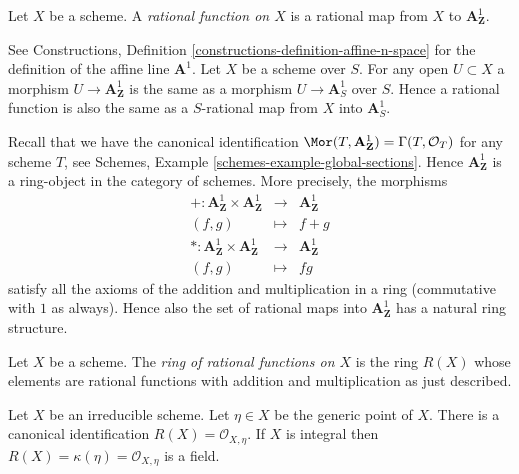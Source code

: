 \begin{definition}
\label{definition-rational-function}
Let $X$ be a scheme. A {\it rational function on $X$} is a rational map
from $X$ to $\mathbf{A}^1_{\mathbf{Z}}$.
\end{definition}

\noindent
See Constructions, Definition \ref{constructions-definition-affine-n-space}
for the definition of the affine line $\mathbf{A}^1$. Let $X$ be a scheme
over $S$. For any open $U \subset X$ a morphism
$U \to \mathbf{A}^1_{\mathbf{Z}}$ is the same as a morphism
$U \to \mathbf{A}^1_S$ over $S$. Hence a rational function is
also the same as a $S$-rational map from $X$ into $\mathbf{A}^1_S$.

\medskip\noindent
Recall that we have the canonical identification
$\Mor(T, \mathbf{A}^1_{\mathbf{Z}}) = \Gamma(T, \mathcal{O}_T)$
for any scheme $T$, see Schemes, Example \ref{schemes-example-global-sections}.
Hence $\mathbf{A}^1_{\mathbf{Z}}$ is a ring-object in the
category of schemes. More precisely, the morphisms
\begin{eqnarray*}
+ : \mathbf{A}^1_{\mathbf{Z}} \times \mathbf{A}^1_{\mathbf{Z}}
& \longrightarrow &
\mathbf{A}^1_{\mathbf{Z}} \\
(f, g) & \longmapsto & f + g \\
* : \mathbf{A}^1_{\mathbf{Z}} \times \mathbf{A}^1_{\mathbf{Z}}
& \longrightarrow &
\mathbf{A}^1_{\mathbf{Z}} \\
(f, g) & \longmapsto & fg
\end{eqnarray*}
satisfy all the axioms of the addition and multiplication in a ring
(commutative with $1$ as always). Hence also the set of rational
maps into $\mathbf{A}^1_{\mathbf{Z}}$ has a natural ring structure.

\begin{definition}
\label{definition-ring-of-rational-functions}
Let $X$ be a scheme. The {\it ring of rational functions on $X$}
is the ring $R(X)$ whose elements are rational functions with
addition and multiplication as just described.
\end{definition}

\begin{lemma}
\label{lemma-integral-scheme-rational-functions}
Let $X$ be an irreducible scheme. Let $\eta \in X$ be the generic point
of $X$. There is a canonical identification
$R(X) = \mathcal{O}_{X, \eta}$. If $X$ is integral then
$R(X) = \kappa(\eta) = \mathcal{O}_{X, \eta}$ is
a field.
\end{lemma}

